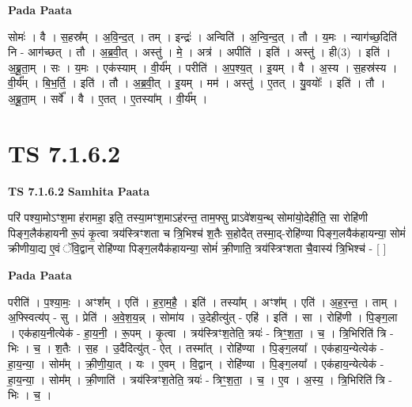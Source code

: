 \documentclass[17pt]{extarticle}
\begin{document}
\textbf{Pada Paata} \newline

सोमः॑ । वै । स॒हस्र᳚म् । अ॒वि॒न्द॒त् । तम् । इन्द्रः॑ । अन्विति॑ । अ॒न्वि॒न्द॒त् । तौ । य॒मः । न्याग॑च्छ॒दिति॑ नि - आग॑च्छत् । तौ । अ॒ब्र॒वी॒त् । अस्तु॑ । मे॒ । अत्र॑ । अपीति॑ । इति॑ । अस्तु॑ । ही(3) । इति॑ । अ॒ब्रू॒ता॒म् । सः । य॒मः । एक॑स्याम् । वी॒र्य᳚म् । परीति॑ । अ॒प॒श्य॒त् । इ॒यम् । वै । अ॒स्य । स॒हस्र॑स्य । वी॒र्य᳚म् । बि॒भ॒र्ति॒ । इति॑ । तौ । अ॒ब्र॒वी॒त् । इ॒यम् । मम॑ । अस्तु॑ । ए॒तत् । यु॒वयोः᳚ । इति॑ । तौ । अ॒ब्रू॒ता॒म् । सर्वे᳚ । वै । ए॒तत् । ए॒तस्या᳚म् । वी॒र्य᳚म् ।  \newline




\section*{ TS 7.1.6.2 }

\textbf{TS 7.1.6.2 } \newline
\textbf{Samhita Paata} \newline

परि॑ पश्या॒मोऽꣳश॒मा ह॑रामहा॒ इति॒ तस्या॒मꣳश॒माऽह॑रन्त॒ ताम॒फ्सु प्राऽवे॑शय॒न्थ् सोमा॑यो॒देहीति॒ सा रोहि॑णी पिङ्ग॒लैक॑हायनी रू॒पं कृ॒त्वा त्रय॑स्त्रिꣳशता च त्रि॒भिश्च॑ श॒तैः स॒होदैत् तस्मा॒द्-रोहि॑ण्या पिङ्ग॒लयैक॑हायन्या॒ सोमं॑ क्रीणीया॒द्य ए॒वं ॅवि॒द्वान् रोहि॑ण्या पिङ्ग॒लयैक॑हायन्या॒ सोमं॑ क्री॒णाति॒ त्रय॑स्त्रिꣳशता चै॒वास्य॑ त्रि॒भिश्च॑ - [  ] \newline

\textbf{Pada Paata} \newline

परीति॑ । प॒श्या॒मः॒ । अꣳश᳚म् । एति॑ । ह॒रा॒म॒है॒ । इति॑ । तस्या᳚म् । अꣳश᳚म् ।  एति॑ । अ॒ह॒र॒न्त॒ । ताम् । अ॒फ्स्वित्य॑प् - सु । प्रेति॑ । अ॒वे॒श॒य॒न्न् । सोमा॑य । उ॒देहीत्यु॑त् - एहि॑ । इति॑ । सा । रोहि॑णी । पि॒ङ्ग॒ला । एक॑हाय॒नीत्येक॑ - हा॒य॒नी॒ । रू॒पम् । कृ॒त्वा । त्रय॑स्त्रिꣳश॒तेति॒ त्रयः॑ - त्रिꣳ॒॒श॒ता॒ । च॒ । त्रि॒भिरिति॑ त्रि - भिः । च॒ । श॒तैः । स॒ह । उ॒दैदित्यु॑त् - ऐत् । तस्मा᳚त् । रोहि॑ण्या । पि॒ङ्ग॒लया᳚ । एक॑हाय॒न्येत्येक॑ - हा॒य॒न्या॒ । सोम᳚म् । क्री॒णी॒या॒त् । यः । ए॒वम् । वि॒द्वान् । रोहि॑ण्या । पि॒ङ्ग॒लया᳚ । एक॑हाय॒न्येत्येक॑ - हा॒य॒न्या॒ । सोम᳚म् । क्री॒णाति॑ । त्रय॑स्त्रिꣳश॒तेति॒ त्रयः॑ - त्रिꣳ॒॒श॒ता॒ । च॒ । ए॒व । अ॒स्य॒ । त्रि॒भिरिति॑ त्रि - भिः । च॒ ।  \newline
\end{document}
